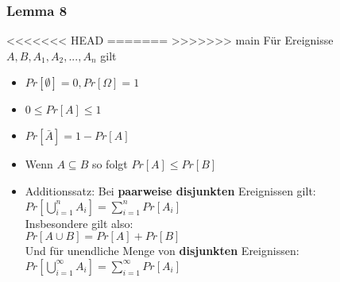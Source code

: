 \documentclass[11pt]{article}
\begin{document}
\subsubsection{Lemma 8}
<<<<<<< HEAD
\label{sec:orgc8d1f8f}
=======
\label{sec:org14906e4}
>>>>>>> main
Für Ereignisse \(A,B, A_1, A_2,...,A_n\) gilt
\begin{itemize}
\item \(Pr[\emptyset] = 0, Pr[\Omega] = 1\)
\item \(0 \leq Pr[A] \leq 1\)
\item \(Pr[\bar{A}] = 1 - Pr[A]\)
\item Wenn \(A \subseteq B\) so folgt \(Pr[A] \leq Pr[B]\)
\item Additionssatz: Bei \textbf{paarweise disjunkten} Ereignissen gilt: \\
\(Pr[\bigcup^{n}_{i=1} A_i] = \sum^n_{i=1} Pr[A_i]\) \\
Insbesondere gilt also:\\
\(Pr[A \cup B] = Pr[A] + Pr[B]\) \\
Und für unendliche Menge von \textbf{disjunkten} Ereignissen:\\
\(Pr[\bigcup^{\infty}_{i=1} A_i] = \sum^{\infty}_{i=1} Pr[A_i]\) \\
\end{itemize}
\end{document}
